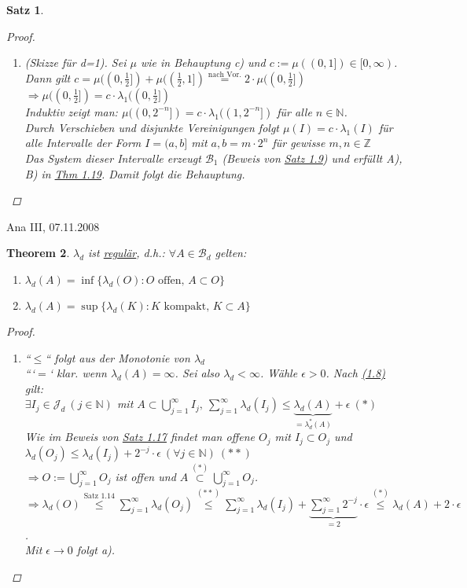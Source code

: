 \documentclass[a4paper]{report}
\newcommand{\N}{\mathbb{N}}
\newcommand{\Z}{\mathbb{Z}}
\newcommand{\Borel}{\mathcal{B}}
\newcommand{\Bd}{\Borel_d}
\newcommand{\Jd}{\mathcal{J}_d}
\newcommand{\jlabel}[1]{\label{j_#1}}
\newcommand{\jshortlink}[1]{\jhyperref{#1}{\text{#1}}}
\newcommand{\jhyperref}[2]{\hyperref[j_#1]{#2}}
\newcommand{\jlink}[1]{\jhyperref{#1}{#1}}
\newcommand{\jspacesmall}{\vspace{4pt}}
\newcommand{\jdate}[1]{\jspacesmall\begin{center}\jlabel{#1}\tiny{Ana III, #1}\end{center}}
\theoremstyle{plain}
\newtheorem{thm}{Theorem}[chapter]
\newtheorem{satz}[thm]{Satz}
\theoremstyle{definition}
\begin{document}
{{{\begin{satz}
\begin{proof}
\begin{enumerate}
            \item
                (Skizze für d=1). Sei $\mu$ wie in Behauptung c) und $c:= \mu((0,1])\in[0,\infty)$. Dann gilt $c = \mu((0, \frac{1}{2}]) + \mu((\frac{1}{2},1]) \overset{\text{nach Vor.}}{=} 2\cdot \mu((0,\frac{1}{2}])$\\
                $\Rightarrow \mu((0,\frac{1}{2}]) = c\cdot\lambda_1((0,\frac{1}{2}])$\\
                Induktiv zeigt man: $\mu((0,2^{-n}]) = c\cdot\lambda_1((1, 2^{-n}])$ für alle $n\in\N$.\\
                Durch Verschieben und disjunkte Vereinigungen folgt $\mu(I) = c\cdot \lambda_1(I)$ für alle Intervalle der Form $I=(a,b]$ mit $a,b = m\cdot 2^n$ für gewisse $m,n \in \Z$\\
                Das System dieser Intervalle erzeugt $\Borel_1$ (Beweis von \jlink{Satz 1.9}) und erfüllt A), B) in \jlink{Thm 1.19}. Damit folgt die Behauptung.
        \end{enumerate}
    \end{proof}
\end{satz}

\jdate{07.11.2008}

\begin{thm}
\jlabel{Thm 1.25}
    $\lambda_d$ ist \uline{regulär}, d.h.: $\forall A \in \Bd$ gelten:
    \begin{enumerate}
        \item $\lambda_d(A) = \inf \{ \lambda_d(O) : O \text{ offen, } A\subset  O\}$
        \item $\lambda_d(A) = \sup \{ \lambda_d(K) : K \text{ kompakt, } K\subset A\}$
    \end{enumerate}
    \begin{proof}
         \begin{enumerate}
             \item 
                ``$\le$`` folgt aus der Monotonie von $\lambda_d$\\
                ```$=$` klar. wenn $\lambda_d(A) = \infty$. Sei also $\lambda_d < \infty$. Wähle $\epsilon > 0$. Nach \jlink{(1.8)} gilt:\\
                $\exists I_j\in \Jd\ (j\in\N)$ mit $A \subset \bigcup_{j=1}^\infty I_j,\ \sum_{j=1}^\infty \lambda_d(I_j) \le \underbrace{\lambda_d(A)}_{= \lambda_d^*(A)} + \epsilon \ (*)$\\
                Wie im Beweis von \jlink{Satz 1.17} findet man offene $O_j$ mit $I_j \subset O_j$ und $\lambda_d(O_j) \le \lambda_d(I_j) + 2^{-j} \cdot \epsilon \ (\forall j\in \N) \ (**)$\\
                $\Rightarrow O := \bigcup_{j=1}^\infty O_j$ ist offen und $A \overset{(*)}{\subset} \bigcup_{j=1}^\infty O_j$.\\
                $\Rightarrow \lambda_d(O) \overset{\jshortlink{Satz 1.14}}{\le} \sum_{j=1}^\infty \lambda_d(O_j) \overset{(**)}{\le} \sum_{j=1}^\infty \lambda_d(I_j) + \underbrace{\sum_{j=1}^\infty 2^{-j}}_{= 2} \cdot \epsilon \overset{(*)}{\le} \lambda_d(A) + 2 \cdot \epsilon$.\\
                Mit $\epsilon \rightarrow 0$ folgt a).
                

\end{enumerate}
\end{proof}
\end{thm}}}}
\end{document}
